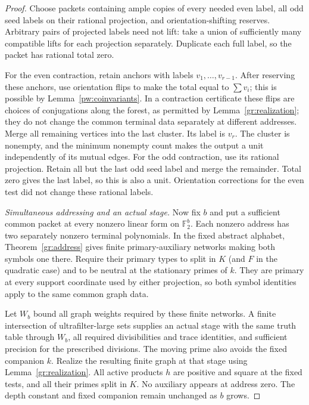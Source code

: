 \begin{proof}
Choose packets containing ample copies of every needed even label, all
odd seed labels on their rational projection, and orientation-shifting
reserves.  Arbitrary pairs of projected labels need not lift: take a
union of sufficiently many compatible lifts for each projection
separately.  Duplicate each full label, so the packet has rational
total zero.

For the even contraction, retain anchors with labels
$v_1,\ldots,v_{r-1}$.  After reserving these anchors, use orientation
flips to make the total equal to $\sum v_i$; this is possible by
Lemma~\ref{pw:coinvariants}.  In a contraction certificate these flips
are choices of conjugations along the forest, as permitted by
Lemma~\ref{gr:realization}; they do not change the common terminal data
separately at different addresses.  Merge all remaining vertices into the
last cluster.  Its label is $v_r$.  The cluster is nonempty, and the
minimum nonempty count makes the output a unit independently of its
mutual edges.  For the odd contraction, use its rational projection.
Retain all but the last odd seed label and merge the remainder.  Total
zero gives the last label,
so this is also a unit.  Orientation corrections for the even test did
not change these rational labels.

\emph{Simultaneous addressing and an actual stage.}
Now fix $b$ and put a sufficient common packet at every nonzero linear
form on $\mathbb F_2^b$.  Each nonzero address has two separately
nonzero terminal polynomials.  In the fixed abstract alphabet,
Theorem~\ref{gr:address} gives finite primary-auxiliary networks making
both symbols one there.  Require their primary types to split in $K$
(and $F$ in the quadratic case) and to be neutral at the stationary
primes of $k$.  They are primary at every support coordinate used by
either projection, so both symbol identities apply to the same common
graph data.

Let $W_b$ bound all graph weights required by these finite networks.
A finite intersection of ultrafilter-large sets supplies an actual stage
with the same truth table through $W_b$, all
required divisibilities and trace identities, and sufficient precision
for the prescribed divisions.  The moving prime also avoids the fixed
companion $k$.  Realize the resulting finite graph at that stage using
Lemma~\ref{gr:realization}.  All active products $h$ are positive and
square at the fixed tests, and all their primes split in $K$.  No
auxiliary appears at address zero.  The depth constant and fixed
companion remain unchanged as $b$ grows.


\end{proof}
